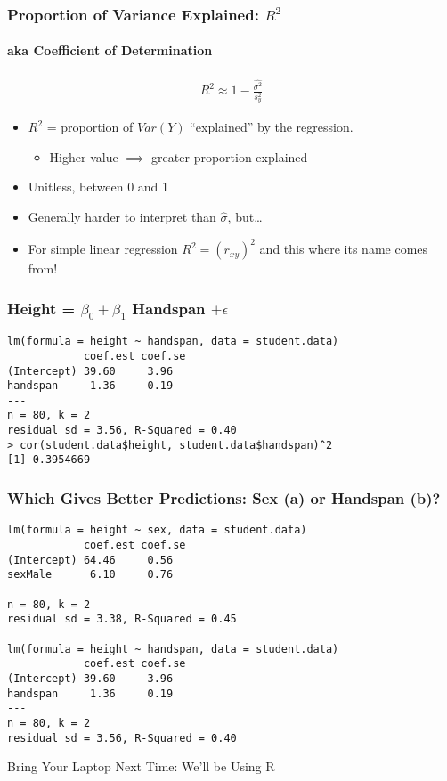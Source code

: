 \begin{frame}
\frametitle{Proportion of Variance Explained: $R^2$}
\framesubtitle{aka Coefficient of Determination}
	\begin{eqnarray*}
		R^2 \approx 1 - \frac{\widehat{\sigma^2}}{s_y^2}
	\end{eqnarray*}
		\begin{itemize}
			\item $R^2$ = proportion of $Var(Y)$ 
        ``explained'' by the regression.
			\begin{itemize}
			\item Higher value $\implies$ greater proportion explained 
			\end{itemize}
			\item Unitless, between 0 and 1 
      \item Generally harder to interpret than $\widehat{\sigma}$, but\dots 
			\item \alert{For simple linear regression $R^2 = (r_{xy})^2$ and this where its name comes from!}
		\end{itemize}
\end{frame}



\begin{frame}[fragile]
\frametitle{Height = $\beta_0 + \beta_1$ Handspan $+ \epsilon$}
\footnotesize
\begin{verbatim}
lm(formula = height ~ handspan, data = student.data)
            coef.est coef.se
(Intercept) 39.60     3.96  
handspan     1.36     0.19  
---
n = 80, k = 2
residual sd = 3.56, R-Squared = 0.40
> cor(student.data$height, student.data$handspan)^2
[1] 0.3954669
\end{verbatim}
\end{frame}


\begin{frame}[fragile]
\frametitle{Which Gives Better Predictions: Sex (a) or Handspan (b)?}
\footnotesize
\begin{verbatim}
lm(formula = height ~ sex, data = student.data)
            coef.est coef.se
(Intercept) 64.46     0.56  
sexMale      6.10     0.76  
---
n = 80, k = 2
residual sd = 3.38, R-Squared = 0.45

lm(formula = height ~ handspan, data = student.data)
            coef.est coef.se
(Intercept) 39.60     3.96  
handspan     1.36     0.19  
---
n = 80, k = 2
residual sd = 3.56, R-Squared = 0.40
\end{verbatim}

\end{frame}


\begin{frame}
\begin{center}
\Huge Bring Your Laptop Next Time: We'll be Using R
\end{center}

\end{frame}



